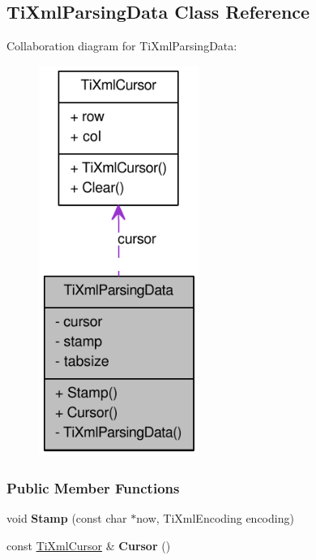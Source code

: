\hypertarget{class_ti_xml_parsing_data}{
\subsection{TiXmlParsingData Class Reference}
\label{class_ti_xml_parsing_data}
}
Collaboration diagram for TiXmlParsingData:\nopagebreak
\begin{figure}[H]
\begin{center}
\leavevmode
\includegraphics[width=148pt]{class_ti_xml_parsing_data__coll__graph}
\end{center}
\end{figure}
\subsubsection*{Public Member Functions}
\begin{DoxyCompactItemize}
\item 
\hypertarget{class_ti_xml_parsing_data_a65cee8ab77a36c605db08c84b4c30a7d}{
void {\bfseries Stamp} (const char $\ast$now, TiXmlEncoding encoding)}
\label{class_ti_xml_parsing_data_a65cee8ab77a36c605db08c84b4c30a7d}

\item 
\hypertarget{class_ti_xml_parsing_data_a56908a17d7d7a6b2e511e62cf1d40d05}{
const \hyperlink{struct_ti_xml_cursor}{TiXmlCursor} \& {\bfseries Cursor} ()}
\label{class_ti_xml_parsing_data_a56908a17d7d7a6b2e511e62cf1d40d05}

\end{DoxyCompactItemize}
